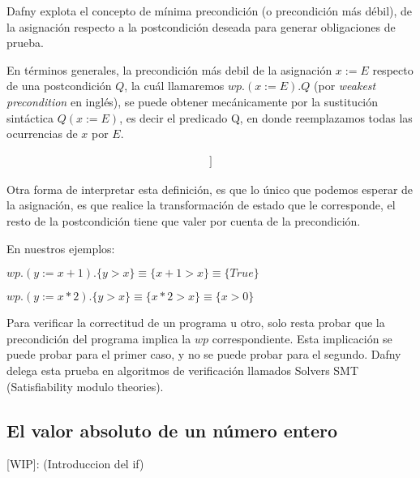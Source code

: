 \documentclass[12pt, a4paper, openany, fleqn]{book}
\begin{document}
    Dafny explota el concepto de mínima precondición (o precondición más débil), de la asignación respecto a la postcondición deseada para generar obligaciones de prueba.

    En términos generales, la precondición más debil de la asignación $x := E$ respecto de una postcondición $Q$, la cuál llamaremos $wp.(x := E).Q$ (por \textit{weakest precondition} en inglés), se puede obtener mecánicamente por la sustitución sintáctica $Q(x := E)$, es decir el predicado Q, en donde reemplazamos todas las ocurrencias de $x$ por $E$.

    \begin{align*}
        [ wp.(x:=E).Q \equiv Q[x:=E] ]
    \end{align*}

    Otra forma de interpretar esta definición, es que lo único que podemos esperar de la asignación, es que realice la transformación de estado que le corresponde, el resto de la postcondición tiene que valer por cuenta de la precondición.

    En nuestros ejemplos:

    $wp.(y := x + 1).\{ y > x \} \equiv \{ x + 1 > x \} \equiv \{ True \}$

    $wp.(y := x * 2).\{ y > x \} \equiv \{ x * 2 > x \} \equiv \{ x > 0 \}$

    Para verificar la correctitud de un programa u otro, solo resta probar que la precondición del programa implica la $wp$ correspondiente. Esta implicación se puede probar para el primer caso, y no se puede probar para el segundo. Dafny delega esta prueba en algoritmos de verificación llamados Solvers SMT (Satisfiability modulo theories).

    \subsection{El valor absoluto de un número entero}
    [WIP]: (Introduccion del if)
\end{document}
